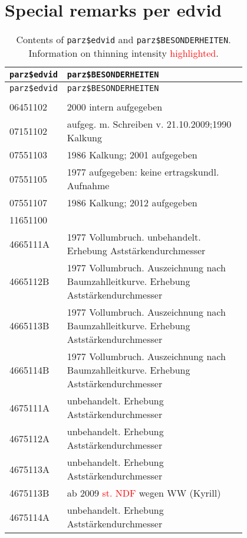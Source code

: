 \section{Special remarks per edvid}

\begin{singlespace}
  {\tabulinesep=2mm
    \begin{longtabu}{l p{0.8\linewidth}}
      \caption{Contents of \texttt{parz\$edvid} and \texttt{parz\$BESONDERHEITEN}.  Information on thinning intensity \textcolor{red}{highlighted}. \label{tab:special_remarks}} \\
      \toprule
      \texttt{parz\$edvid} & \texttt{parz\$BESONDERHEITEN} \\
      \midrule
      \endfirsthead
      \texttt{parz\$edvid} & \texttt{parz\$BESONDERHEITEN} \\
      \midrule
      \endhead
      \bottomrule
       & \\
      06451102 & 2000  intern aufgegeben \\
      07151102 & aufgeg. m. Schreiben v. 21.10.2009;1990 Kalkung \\
      07551103 & 1986 Kalkung; 2001 aufgegeben \\
      07551105 & 1977 aufgegeben:  keine ertragskundl. Aufnahme \\
      07551107 & 1986 Kalkung; 2012 aufgegeben \\
      11651100 & \\
      4665111A & 1977 Vollumbruch. unbehandelt. Erhebung Aststärkendurchmesser \\
      4665112B & 1977 Vollumbruch. Auszeichnung nach Baumzahlleitkurve. Erhebung Aststärkendurchmesser \\
      4665113B & 1977 Vollumbruch. Auszeichnung nach Baumzahlleitkurve. Erhebung Aststärkendurchmesser \\
      4665114B & 1977 Vollumbruch. Auszeichnung nach Baumzahlleitkurve. Erhebung Aststärkendurchmesser \\
      4675111A & unbehandelt. Erhebung Aststärkendurchmesser \\
      4675112A & unbehandelt. Erhebung Aststärkendurchmesser \\
      4675113A & unbehandelt. Erhebung Aststärkendurchmesser \\
      4675113B & ab 2009 \textcolor{red}{st. NDF} wegen WW (Kyrill) \\
      4675114A & unbehandelt. Erhebung Aststärkendurchmesser \\

\end{longtabu}}
\end{singlespace}
